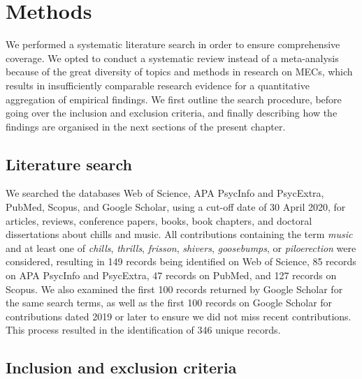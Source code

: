 \section{Methods}
\label{se:rev-methods}

We performed a systematic literature search in order to ensure comprehensive coverage. We opted to conduct a systematic review instead of a meta-analysis because of the great diversity of topics and methods in research on MECs, which results in insufficiently comparable research evidence for a quantitative aggregation of empirical findings. We first outline the search procedure, before going over the inclusion and exclusion criteria, and finally describing how the findings are organised in the next sections of the present chapter.

\subsection{Literature search}

We searched the databases Web of Science, APA PsycInfo and PsycExtra, PubMed, Scopus, and Google Scholar, using a cut-off date of 30 April 2020, for articles, reviews, conference papers, books, book chapters, and doctoral dissertations about chills and music. All contributions containing the term \emph{music} and at least one of \emph{chills}, \emph{thrills}, \emph{frisson}, \emph{shivers}, \emph{goosebumps}, or \emph{piloerection} were considered, resulting in 149 records being identified on Web of Science, 85 records on APA PsycInfo and PsycExtra, 47 records on PubMed, and 127 records on Scopus. We also examined the first 100 records returned by Google Scholar for the same search terms, as well as the first 100 records on Google Scholar for contributions dated 2019 or later to ensure we did not miss recent contributions. This process resulted in the identification of 346 unique records.

\subsection{Inclusion and exclusion criteria}

